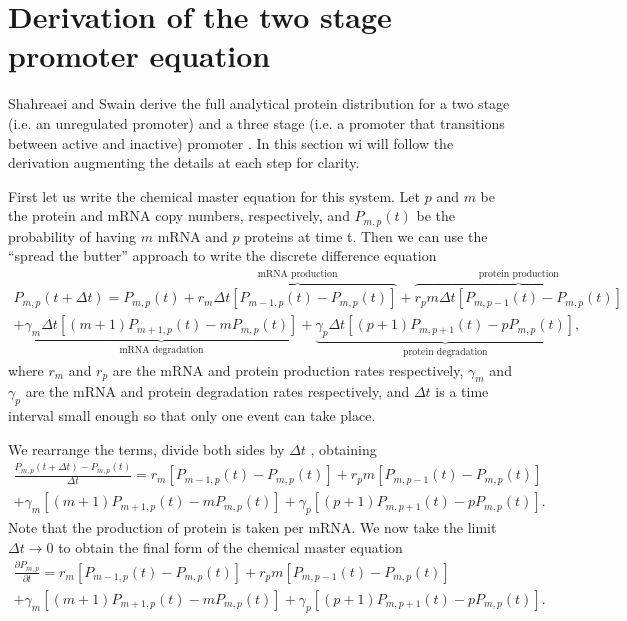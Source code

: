 \section{Derivation of the two stage promoter equation}

Shahreaei and Swain derive the full analytical protein distribution for a two
stage (i.e. an unregulated promoter) and a three stage (i.e. a promoter that
transitions between active and inactive) promoter \cite{Shahrezaei2008}. In
this section wi will follow the derivation augmenting the details at each step
for clarity.

First let us write the chemical master equation for this system. Let $p$ and $m$
be the protein and mRNA copy numbers, respectively, and $P_{m,p}(t)$ be the
probability of having $m$ mRNA and $p$ proteins at time t. Then we can use the
``spread the butter'' approach to write the discrete difference equation
\begin{equation}
\begin{aligned}
P_{m,p}(t + \Delta t) =
P_{m,p}(t) +
\overbrace{r_m \Delta t
\left[ P_{m-1,p}(t) - P_{m,p}(t) \right]}^\text{mRNA production}
+ \overbrace{r_p m \Delta t
\left[ P_{m, p-1}(t) - P_{m, p}(t) \right]}^\text{protein production}\\
+ \underbrace{\gamma_m \Delta t
\left[ (m + 1) P_{m+1,p}(t) - m P_{m, p}(t) \right]}_\text{mRNA degradation}
+ \underbrace{\gamma_p \Delta t
\left[ (p + 1) P_{m, p+1}(t) - p P_{m, p}(t) \right]}_\text{protein
degradation},
\end{aligned}
\end{equation}
where $r_m$ and $r_p$ are the mRNA and protein production rates respectively,
$\gamma_m$ and $\gamma_p$ are the mRNA and protein degradation rates
respectively, and $\Delta t$ is a time interval small enough so that only one
event can take place.

We rearrange the terms, divide both sides by $\Delta t$ , obtaining
\begin{equation}
  \begin{aligned}
\frac{P_{m,p}(t + \Delta t) - P_{m,p}(t)}{\Delta t} =
r_m \left[ P_{m-1,p}(t) - P_{m,p}(t) \right]
+ r_p m \left[ P_{m, p-1}(t) - P_{m, p}(t) \right]\\
+ \gamma_m \left[ (m + 1) P_{m+1,p}(t) - m P_{m, p}(t) \right]
+ \gamma_p \left[ (p + 1) P_{m, p+1}(t) - p P_{m, p}(t) \right].
  \end{aligned}
\end{equation}
Note that the production of protein is taken per mRNA.
We now take the limit $\Delta t \rightarrow 0$ to obtain the final form of the
chemical master equation
\begin{equation}
  \begin{aligned}
\frac{\partial P_{m,p}}{\partial t} =
r_m \left[ P_{m-1,p}(t) - P_{m,p}(t) \right] +
r_p m \left[ P_{m, p-1}(t) - P_{m, p}(t) \right]\\
+ \gamma_m \left[ (m + 1) P_{m+1,p}(t)
- m P_{m, p}(t) \right]
+ \gamma_p \left[ (p + 1) P_{m, p+1}(t) - p P_{m, p}(t) \right].
  \end{aligned}
\end{equation}

